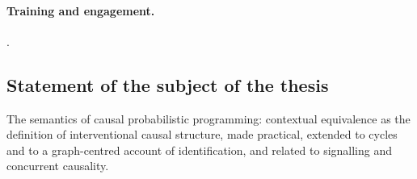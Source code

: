 \paragraph{Training and engagement.} .

\subsection*{Statement of the subject of the thesis}

The semantics of causal probabilistic programming: contextual equivalence as the definition of interventional causal structure, made practical, extended to cycles and to a graph-centred account of identification, and related to signalling and concurrent causality.
